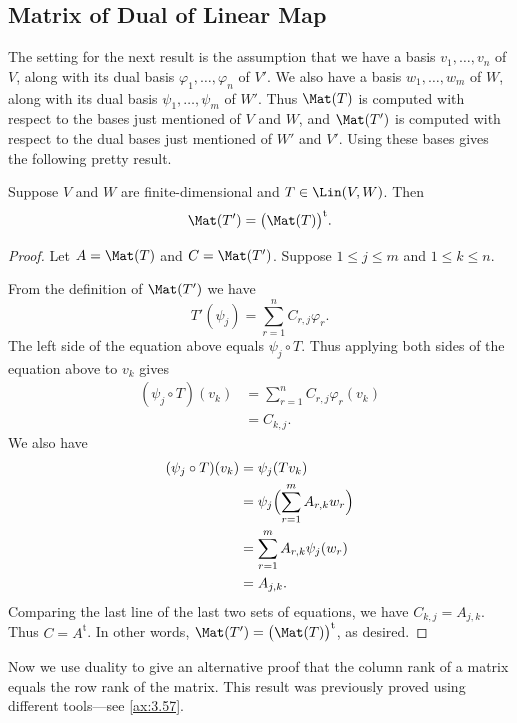 \subsection{Matrix of Dual of Linear Map}

The setting for the next result is the assumption that we have a basis
$v_1,\dots,v_n$ of $V$, along with its dual basis $\varphi_1,\dots,\varphi_n$ of
$V'$. We also have a basis $w_1,\dots,w_m$ of $W$, along with its dual basis
$\psi_1,\dots,\psi_m$ of $W'$. Thus $\Mat(T)$ is computed with respect to the
bases just mentioned of $V$ and $W$, and $\Mat(T')$ is computed with respect to
the dual bases just mentioned of $W'$ and $V'$. Using these bases gives the
following pretty result.

\begin{result}\label{ax:3.132}
Suppose $V$ and $W$ are finite-dimensional and $T\in\Lin(V,W)$. Then
\[ \Mat(T') = \bigl(\Mat(T)\bigr)^{\mathrm{t}}. \]
\end{result}

\begin{proof}
Let $A=\Mat(T)$ and $C=\Mat(T')$. Suppose $1\le j\le m$ and $1\le k\le n$.

From the definition of $\Mat(T')$ we have
\[ T'(\psi_j) = \sum_{r=1}^n C_{r,j}\varphi_r. \]
The left side of the equation above equals $\psi_j\circ T$. Thus applying both
sides of the equation above to $v_k$ gives
\begin{align*}
(\psi_j\circ T)(v_k) &= \sum_{r=1}^n C_{r,j}\varphi_r(v_k)\\
                     &= C_{k,j}.
\end{align*}
We also have
\begin{align*}
(\psi_j\circ T)(v_k) &= \psi_j(Tv_k)\\
  &= \psi_j\Bigl(\sum_{r=1}^m A_{r,k}w_r\Bigr)\\
  &= \sum_{r=1}^m A_{r,k}\psi_j(w_r)\\
  &= A_{j,k}.
\end{align*}
Comparing the last line of the last two sets of equations, we have
$C_{k,j}=A_{j,k}$. Thus $C=A^{\mathrm{t}}$. In other words,
$\Mat(T')=\bigl(\Mat(T)\bigr)^{\mathrm{t}}$, as desired.
\end{proof}

Now we use duality to give an alternative proof that the column rank of a matrix
equals the row rank of the matrix. This result was previously proved using
different tools---see \ref{ax:3.57}.


